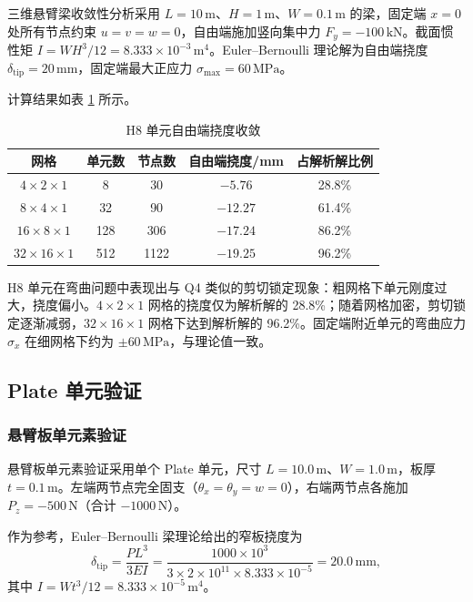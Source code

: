 \documentclass[UTF8,a4paper,zihao=-4]{ctexart}
\begin{document}
三维悬臂梁收敛性分析采用 $L=10\,\mathrm{m}$、$H=1\,\mathrm{m}$、$W=0.1\,\mathrm{m}$ 的梁，固定端 $x=0$ 处所有节点约束 $u=v=w=0$，自由端施加竖向集中力 $F_y=-100\,\mathrm{kN}$。截面惯性矩 $I=WH^3/12=8.333\times10^{-3}\,\mathrm{m^4}$。Euler--Bernoulli 理论解为自由端挠度 $\delta_{\mathrm{tip}}=20\,\mathrm{mm}$，固定端最大正应力 $\sigma_{\max}=60\,\mathrm{MPa}$。

计算结果如表 \ref{tab:h8_conv} 所示。

\begin{table}[H]
    \centering
    \caption{H8 单元自由端挠度收敛}
    \label{tab:h8_conv}
    \begin{tabular}{ccccc}
        \toprule
        网格 & 单元数 & 节点数 & 自由端挠度/mm & 占解析解比例\\
        \midrule
        $4\times2\times1$ & 8 & 30 & $-5.76$ & 28.8\%\\
        $8\times4\times1$ & 32 & 90 & $-12.27$ & 61.4\%\\
        $16\times8\times1$ & 128 & 306 & $-17.24$ & 86.2\%\\
        $32\times16\times1$ & 512 & 1122 & $-19.25$ & 96.2\%\\
        \bottomrule
    \end{tabular}
\end{table}

H8 单元在弯曲问题中表现出与 Q4 类似的剪切锁定现象：粗网格下单元刚度过大，挠度偏小。$4\times2\times1$ 网格的挠度仅为解析解的 28.8\%；随着网格加密，剪切锁定逐渐减弱，$32\times16\times1$ 网格下达到解析解的 96.2\%。固定端附近单元的弯曲应力 $\sigma_x$ 在细网格下约为 $\pm60\,\mathrm{MPa}$，与理论值一致。

\subsection{Plate 单元验证}

\subsubsection{悬臂板单元素验证}

悬臂板单元素验证采用单个 Plate 单元，尺寸 $L=10.0\,\mathrm{m}$、$W=1.0\,\mathrm{m}$，板厚 $t=0.1\,\mathrm{m}$。左端两节点完全固支（$\theta_x=\theta_y=w=0$），右端两节点各施加 $P_z=-500\,\mathrm{N}$（合计 $-1000\,\mathrm{N}$）。

作为参考，Euler--Bernoulli 梁理论给出的窄板挠度为
\[
    \delta_{\mathrm{tip}} = \frac{PL^3}{3EI} = \frac{1000\times10^3}{3\times2\times10^{11}\times8.333\times10^{-5}} = 20.0\,\mathrm{mm},
\]
其中 $I=Wt^3/12=8.333\times10^{-5}\,\mathrm{m^4}$。
\end{document}
